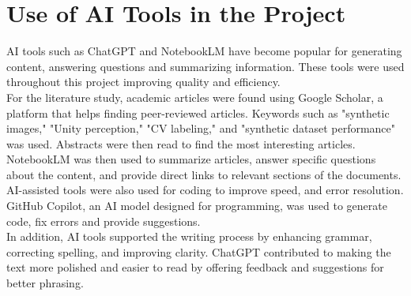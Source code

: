 \section{Use of AI Tools in the Project}

AI tools such as ChatGPT and NotebookLM have become popular for generating content, answering questions and summarizing information. These tools were used throughout this project improving quality and efficiency. \\


\noindent For the literature study, academic articles were found using Google Scholar, a platform that helps finding peer-reviewed articles. Keywords such as "synthetic images," "Unity perception," "CV labeling," and "synthetic dataset performance" was used. Abstracts were then read to find the most interesting articles. NotebookLM was then used to summarize articles, answer specific questions about the content, and provide direct links to relevant sections of the documents.\\

\noindent AI-assisted tools were also used for coding to improve speed, and error resolution. GitHub Copilot, an AI model designed for programming, was used to generate code, fix errors and provide suggestions.\\

\noindent In addition, AI tools supported the writing process by enhancing grammar, correcting spelling, and improving clarity. ChatGPT contributed to making the text more polished and easier to read by offering feedback and suggestions for better phrasing.


